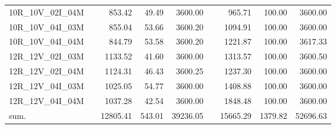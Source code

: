 \begin{tabular}{llrrrlrrr}
10R\_10V\_02I\_04M & \hspace{0.1cm} & 853.42 & 49.49 & 3600.00 & \hspace{0.2cm} & 965.71 & 100.00 & 3600.00\\
10R\_10V\_04I\_03M & \hspace{0.1cm} & 855.04 & 53.66 & 3600.20 & \hspace{0.2cm} & 1094.91 & 100.00 & 3600.00\\
10R\_10V\_04I\_04M & \hspace{0.1cm} & 844.79 & 53.58 & 3600.20 & \hspace{0.2cm} & 1221.87 & 100.00 & 3617.33\\
\addlinespace
12R\_12V\_02I\_03M & \hspace{0.1cm} & 1133.52 & 41.60 & 3600.00 & \hspace{0.2cm} & 1313.57 & 100.00 & 3600.50\\
12R\_12V\_02I\_04M & \hspace{0.1cm} & 1124.31 & 46.43 & 3600.25 & \hspace{0.2cm} & 1237.30 & 100.00 & 3600.00\\
12R\_12V\_04I\_03M & \hspace{0.1cm} & 1025.05 & 54.77 & 3600.00 & \hspace{0.2cm} & 1408.88 & 100.00 & 3600.00\\
12R\_12V\_04I\_04M & \hspace{0.1cm} & 1037.28 & 42.54 & 3600.00 & \hspace{0.2cm} & 1848.48 & 100.00 & 3600.00\\
\addlinespace
sum. & \hspace{0.1cm} & 12805.41 & 543.01 & 39236.05 & \hspace{0.2cm} & 15665.29 & 1379.82 & 52696.63\\
\bottomrule
\end{tabular}
